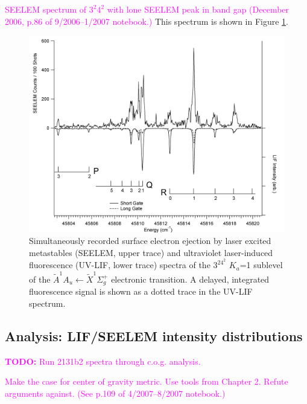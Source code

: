 \documentclass[12pt]{mitthesis}
\newcommand{\TODO} [1]{\textcolor{magenta}{\textbf{TODO:} #1}}
\newcommand{\POINT}[1]{\textcolor{magenta}{#1}}
\begin{document}
\POINT{SEELEM spectrum of $3^2 4^2$ with lone SEELEM peak in band gap
  (December 2006, p.86 of 9/2006--1/2007 notebook.)}  This spectrum is
shown in Figure \ref{fig:spectrum-32b2}.

\begin{figure}
  \caption{
    Simultaneously recorded surface electron ejection by laser excited
    metastables (SEELEM, upper trace) and ultraviolet laser-induced
    fluorescence (UV-LIF, lower trace) spectra of the $3^24^2$ $K_a$=1
    sublevel of the $\tilde{A}^1A_u \leftarrow \tilde{X} ^1\Sigma_g^+$
    electronic transition. A delayed, integrated fluorescence signal
    is shown as a dotted trace in the UV-LIF spectrum.}
  \label{fig:spectrum-32b2}
  \centering
  \includegraphics[width=8in,angle=90]{spectrum-32b2.png}
\end{figure}

\subsection{Analysis: LIF/SEELEM intensity distributions}

\TODO{Run 2131b2 spectra through c.o.g. analysis.}

\POINT{Make the case for center of gravity metric. Use tools from
  Chapter 2.  Refute arguments against.  (See p.109 of 4/2007--8/2007
  notebook.)}

\end{document}
